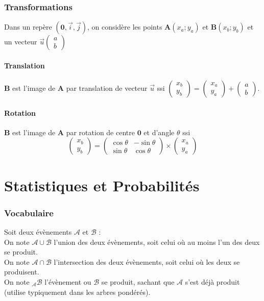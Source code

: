 \documentclass{article}
\begin{document}
\section{Transformations}
Dans un repère $(\mathbf{0},\Vec{i},\Vec{j})$, on considère les points $\mathbf{A}(x_a;y_a)$ et $\mathbf{B}(x_b;y_b)$ et un vecteur $\Vec{u}\begin{pmatrix}a\\b\end{pmatrix}$

\subsection{Translation}
$\mathbf{B}$ est l'image de $\mathbf{A}$ par translation de vecteur $\Vec{u}$ ssi $\begin{pmatrix}x_b\\y_b\end{pmatrix} = \begin{pmatrix}x_a\\y_a\end{pmatrix} + \begin{pmatrix}a\\b\end{pmatrix}.$

\subsection{Rotation}
$\mathbf{B}$ est l'image de $\mathbf{A}$ par rotation de centre $\mathbf{0}$ et d'angle $\theta$ ssi $$\begin{pmatrix}x_b\\y_b\end{pmatrix} = \begin{pmatrix}\cos \theta & -\sin \theta \\\sin \theta & \cos \theta\end{pmatrix} \times \begin{pmatrix}x_a\\y_a\end{pmatrix}$$



\pagebreak\pagebreak\part{Statistiques et Probabilités}
\setcounter{section}{0}
\renewcommand*{\theHsection}{chX.\the\value{section}}


\section{Vocabulaire}
Soit deux évènements $\mathcal{A}$ et $\mathcal{B}$ :\\
On note $\mathcal{A} \cup \mathcal{B}$ l'union des deux évènements, soit celui où au moins l'un des deux se produit.\\
On note $\mathcal{A} \cap \mathcal{B}$ l'intersection des deux évènements, soit celui où les deux se produisent.\\
On note $\mathcal{_AB}$ l'évènement ou $\mathcal{B}$ se produit, sachant que $\mathcal{A}$ s'est déjà produit (utilise typiquement dans les arbres pondérés).\\
\end{document}
